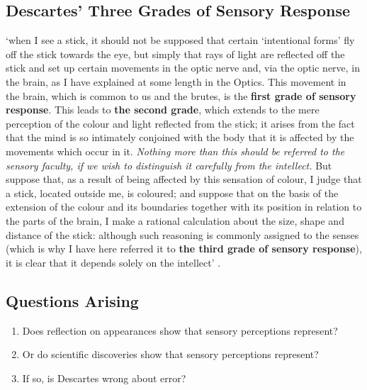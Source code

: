 \documentclass[12pt]{extarticle}
\begin{document}
\begin{multicols*}{3}
\subsection{Descartes’ Three Grades of Sensory Response}
‘when I see a stick, it should not be supposed that certain ‘intentional
forms’ fly off the stick towards the eye, but simply that rays of light
are reflected off the stick and set up certain movements in the optic nerve
and, via the optic nerve, in the brain, as I have explained at some length
in the Optics. This movement in the brain, which is common to us and the
brutes, is the \textbf{first grade of sensory response}. This leads to 
\textbf{the second
grade}, which extends to the mere perception of the colour and light
reflected from the stick; it arises from the fact that the mind is so
intimately conjoined with the body that it is affected by the movements
which occur in it. 
\emph{Nothing more than this should be referred to the sensory
faculty, if we wish to distinguish it carefully from the intellect.} 
But
suppose that, as a result of being affected by this sensation of colour, I
judge that a stick, located outside me, is coloured; and suppose that on
the basis of the extension of the colour and its boundaries together with
its position in relation to the parts of the brain, I make a rational
calculation about the size, shape and distance of the stick: although such
reasoning is commonly assigned to the senses (which is why I have here
referred it to \textbf{the third grade of sensory response}), it is clear that it
depends solely on the intellect’
\citep[p.~295, AT VII:437]{descartes:1985_csm2}.
 

\subsection{Questions Arising}

\begin{enumerate}
\item Does reflection on appearances show that sensory perceptions represent?
\item Or do scientific discoveries show that sensory perceptions represent?
\item If so, is Descartes wrong about error?
\end{enumerate}



                

                

              
 

\end{multicols*}
\end{document}
